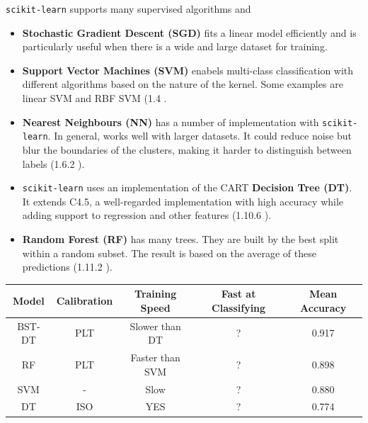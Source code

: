 \documentclass[11pt,openright,a4paper]{report}
\begin{document}
\texttt{scikit-learn} supports many supervised algorithms and 
\begin{itemize}
  \item \textbf{Stochastic Gradient Descent (SGD)} fits a linear model efficiently and is particularly useful when there is a wide and large dataset for training. 
  \item \textbf{Support Vector Machines (SVM)} enabels multi-class classification with different algorithms based on the nature of the kernel. Some examples are linear SVM and RBF SVM (1.4 \cite{scikit-docs-supervised}.
  \item \textbf{Nearest Neighbours (NN)} has a number of implementation with \texttt{scikit-learn}. In general, works well with larger datasets. It could reduce noise but blur the boundaries of the clusters, making it harder to distinguish between labels (1.6.2 \cite{scikit-doccs-supervised}). 
  \item \texttt{scikit-learn} uses an implementation of the CART \textbf{Decision Tree (DT)}. It extends C4.5, a well-regarded implementation with high accuracy while adding support to regression and other features (1.10.6 \cite{scikit-docs-supervised}). 
  \item \textbf{Random Forest (RF)} has many trees. They are built by the best split within a random subset. The result is based on the average of these predictions (1.11.2 \cite{scikit-docs-supervised}).
\end{itemize}

\parbox{\linewidth}{
  \centering
  \begin{tabular}{|c|c|c|c|c|}
    \hline
    Model    & Calibration & Training Speed  & Fast at Classifying & Mean Accuracy
    \\\hline
    BST-DT   & PLT         & Slower than DT  & ?                   & 0.917
    \\\hline
    RF       & PLT         & Faster than SVM & ?                   & 0.898
    \\\hline
    SVM      & -           & Slow            & ?                   & 0.880
    \\\hline
    DT       & ISO         & YES             & ?                   & 0.774
    \\\hline
  \end{tabular}

  \label{tab:comparison}
}
\end{document}

